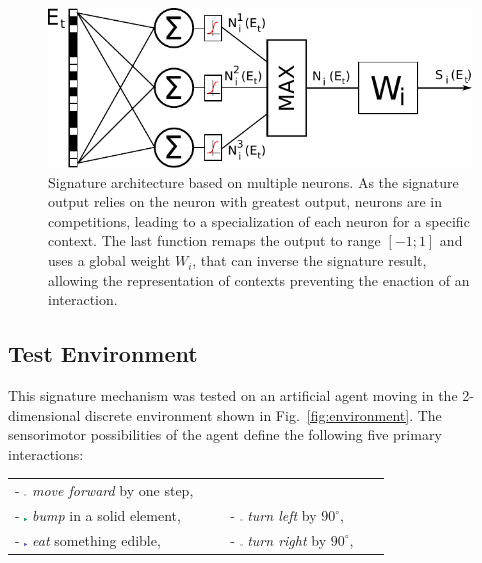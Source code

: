 \documentclass[conference]{IEEEtran}
\begin{document}
\begin{figure}[htbp]
\centerline{\includegraphics[scale=0.6]{img/signature_model2.pdf}}
\caption{Signature architecture based on multiple neurons. As the signature output relies on the neuron with greatest output, neurons are in competitions, leading to a specialization of each neuron for a specific context. The last function remaps the output to range $[-1;1]$ and uses a global weight $W_i$, that can inverse the signature result, allowing the representation of contexts preventing the enaction of an interaction.}
\label{fig:neuron}
\end{figure}

\subsection{Test Environment}\label{implementation}

This signature mechanism was tested on an artificial agent moving in the 2-dimensional discrete environment shown in Fig.~\ref{fig:environment}.
The sensorimotor possibilities of the agent define the following five primary interactions:

 \begin{tabular}{ l l }
   - \includegraphics[width=0.015\textwidth]{img/mf0.pdf} \textit{move forward} by one step, \\
   - \includegraphics[width=0.015\textwidth]{img/mf1.pdf} \textit{bump} in a solid element, &
   - \includegraphics[width=0.02\textwidth]{img/lt0.pdf} \textit{turn left} by $90^\circ$, \\
   - \includegraphics[width=0.015\textwidth]{img/mf2.pdf} \textit{eat} something edible, &
   - \includegraphics[width=0.02\textwidth]{img/rt0.pdf} \textit{turn right} by $90^\circ$, \\
 \end{tabular}
\end{document}
